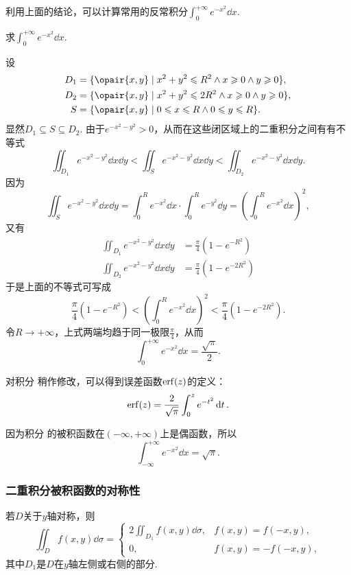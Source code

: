 利用上面的结论，可以计算常用的反常积分\(\int_0^{+\infty} e^{-x^2} \dd{x}\).
\begin{example}
求\(\int_0^{+\infty} e^{-x^2} \dd{x}\).
\begin{solution}
设\begin{align*}
D_1 &= \{ \opair{x,y} \mid x^2+y^2 \leqslant R^2 \land x \geqslant 0 \land y \geqslant 0 \}, \\
D_2 &= \{ \opair{x,y} \mid x^2+y^2 \leqslant 2 R^2 \land x \geqslant 0 \land y \geqslant 0 \}, \\
S &= \{ \opair{x,y} \mid 0 \leqslant x \leqslant R \land 0 \leqslant y \leqslant R \}.
\end{align*}显然\(D_1 \subseteq S \subseteq D_2\).
由于\(e^{-x^2-y^2} > 0\)，从而在这些闭区域上的二重积分之间有有不等式\[
\iint_{D_1} e^{-x^2-y^2}\dd{x}\dd{y}
< \iint_{S} e^{-x^2-y^2}\dd{x}\dd{y}
< \iint_{D_2} e^{-x^2-y^2}\dd{x}\dd{y}.
\]因为\[
\iint_{S}{e^{-x^2-y^2}\dd{x}\dd{y}}
= \int_0^R e^{-x^2}\dd{x} \cdot \int_0^R e^{-y^2} \dd{y}
= \left( \int_0^R e^{-x^2} \dd{x} \right)^2,
\]又有\begin{align*}
\iint_{D_1}{e^{-x^2-y^2}\dd{x}\dd{y}}
&= \frac{\pi}{4} (1 - e^{-R^2}) \\
\iint_{D_2}{e^{-x^2-y^2}\dd{x}\dd{y}}
&= \frac{\pi}{4} (1 - e^{-2 R^2})
\end{align*}于是上面的不等式可写成\[
\frac{\pi}{4} (1 - e^{-R^2})
< \left( \int_0^R e^{-x^2} \dd{x} \right)^2
< \frac{\pi}{4} (1 - e^{-2 R^2}).
\]令\(R \to +\infty\)，上式两端均趋于同一极限\(\frac{\pi}{4}\)，从而
\begin{equation}\label{equation:重积分.常用积分1}
\int_0^{+\infty} e^{-x^2} \dd{x} = \frac{\sqrt{\pi}}{2}.
\end{equation}
\end{solution}
\end{example}
对积分  稍作修改，可以得到误差函数\(\erf(z)\)的定义：
\begin{equation}
\erf(z) = \frac{2}{\sqrt{\pi}} \int_0^z e^{-t^2} \dd{t}.
\end{equation}

因为积分  的被积函数在\((-\infty,+\infty)\)上是偶函数，所以\begin{equation}\label{equation:重积分.常用积分2}
\int_{-\infty}^{+\infty} e^{-x^2} \dd{x} = \sqrt{\pi}.
\end{equation}

\subsubsection{二重积分被积函数的对称性}
\begingroup
\def\intx#1{\iint_{#1} f(x,y) \dd{\sigma}}
若\(D\)关于\(y\)轴对称，则\[
\intx{D} = \left\{ \begin{array}{cc}
2 \intx{D_1}, & f(x,y) = f(-x,y), \\
0, & f(x,y) = -f(-x,y),
\end{array} \right.
\]其中\(D_1\)是\(D\)在\(y\)轴左侧或右侧的部分.

